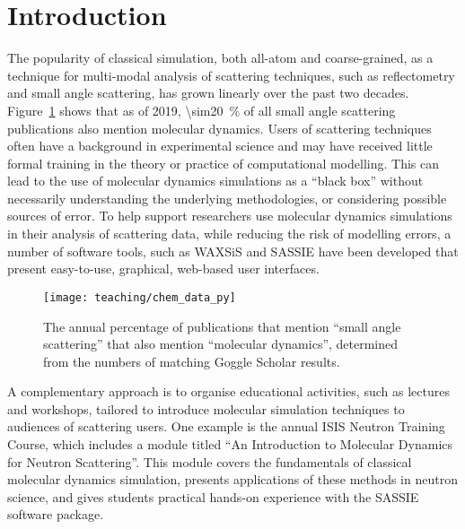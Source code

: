 \section{Introduction}
The popularity of classical simulation, both all-atom and coarse-grained, as a technique for multi-modal analysis of scattering techniques, such as reflectometry and small angle scattering, has grown linearly over the past two decades.\autocite{pan_molecular_2012,boldon_review_2015,hub_interpreting_2018,koutsioubas_combined_2016,darre_molecular_2015,scoppola_combining_2018}
Figure~\ref{fig:growth} shows that as of 2019, \SI{\sim20}{\percent} of all small angle scattering publications also mention molecular dynamics.
Users of scattering techniques often have a background in experimental science and may have received little formal training in the theory or practice of computational modelling.
This can lead to the use of molecular dynamics simulations as a ``black box'' without necessarily understanding the underlying methodologies, or considering possible sources of error.
To help support researchers use molecular dynamics simulations in their analysis of scattering data, while reducing the risk of modelling errors, a number of software tools, such as WAXSiS\autocite{chen_validating_2014,knight_waxsis_2015} and SASSIE\autocite{perkins_atomistic_2016} have been developed that present easy-to-use, graphical, web-based user interfaces.
%
\begin{figure}
    \centering
    \texttt{[image: teaching/chem\_data\_py]}
    \caption{The annual percentage of publications that mention ``small angle scattering'' that also mention ``molecular dynamics'', determined from the numbers of matching Goggle Scholar results.}
    \label{fig:growth}
\end{figure}
%

A complementary approach is to organise educational activities, such as lectures and workshops, tailored to introduce molecular simulation techniques to audiences of scattering users.
One example is the annual ISIS Neutron Training Course, which includes a module titled ``An Introduction to Molecular Dynamics for Neutron Scattering''.
This module covers the fundamentals of classical molecular dynamics simulation, presents applications of these methods in neutron science, and gives students practical hands-on experience with the SASSIE software package.\autocite{perkins_atomistic_2016}

